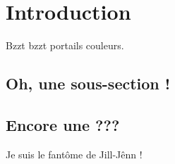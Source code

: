 \section{Introduction}

Bzzt bzzt portails couleurs.

\subsection{Oh, une sous-section !}

\subsection{Encore une ???}

Je suis le fantôme de Jill-Jênn !

